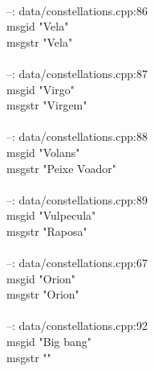 \documentclass[10pt]{article}
\begin{document}
\\
--: data/constellations.cpp:86\\
msgid "Vela"\\
msgstr "Vela"\\
\\
--: data/constellations.cpp:87\\
msgid "Virgo"\\
msgstr "Virgem"\\
\\
--: data/constellations.cpp:88\\
msgid "Volans"\\
msgstr "Peixe Voador"\\
\\
--: data/constellations.cpp:89\\
msgid "Vulpecula"\\
msgstr "Raposa"\\
\\
--: data/constellations.cpp:67\\
msgid "Orion"\\
msgstr "Orion"\\
\\
--: data/constellations.cpp:92\\
msgid "Big bang"\\
msgstr ""\\
\end{document}
